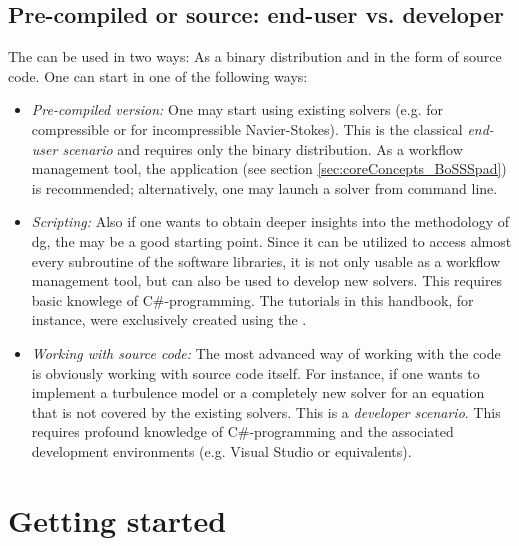 \documentclass[a4paper,10pt]{report} %
\begin{document}
\section{Pre-compiled or source: end-user vs. developer}
\label{sec:coreConcepts_using}
The \BoSSS{} can be used in two ways: As a binary distribution and in the form of source code.
One can start in one of the following ways:
\begin{itemize}
\item
\emph{Pre-compiled version:}
One may start using existing solvers
(e.g.  for compressible or  for incompressible Navier-Stokes).
This is the classical \emph{end-user scenario} and requires only the binary distribution.
As a workflow management tool, the \BoSSSpad{} application 
(see section \ref{sec:coreConcepts_BoSSSpad})
is recommended; 
alternatively, one may launch a solver from command line.

\item
\emph{Scripting:}
Also if one wants to obtain deeper insights into the methodology of \ac{dg},
the  may be a good starting point.
Since it can be utilized to access almost every subroutine of the \BoSSS{} software libraries,
it is not only usable as a workflow management tool, 
but can also be used to develop new solvers.
This requires basic knowlege of C\#-programming.
The tutorials in this handbook, for instance, were exclusively
created using the \BoSSSpad{}.

\item
\emph{Working with source code:}
The most advanced way of working with the \BoSSS{} code is obviously
working with source code itself.
For instance, if one wants to implement a turbulence model or a completely new solver 
for an equation that is not covered by the existing solvers.
This is a \emph{developer scenario}. 
This requires profound knowledge of C\#-programming and the 
associated development environments (e.g. Visual Studio or equivalents).

\end{itemize}


\chapter{Getting started}
\label{sec:gettingStarted}
\end{document}
